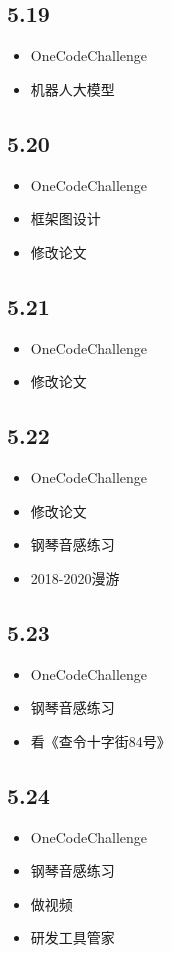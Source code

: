 \documentclass[UTF8]{ctexart}
\begin{document}
\subsection*{5.19}
\begin{itemize}
    \item OneCodeChallenge
    \item 机器人大模型
\end{itemize}

\subsection*{5.20}
\begin{itemize}
    \item OneCodeChallenge
    \item 框架图设计
    \item 修改论文
\end{itemize}

\subsection*{5.21}
\begin{itemize}
    \item OneCodeChallenge
    \item 修改论文
\end{itemize}

\subsection*{5.22}
\begin{itemize}
    \item OneCodeChallenge
    \item 修改论文
    \item 钢琴音感练习
    \item 2018-2020漫游
\end{itemize}

\subsection*{5.23}
\begin{itemize}
    \item OneCodeChallenge
    \item 钢琴音感练习
    \item 看《查令十字街84号》
\end{itemize}

\subsection*{5.24}
\begin{itemize}
    \item OneCodeChallenge
    \item 钢琴音感练习
    \item 做视频
    \item 研发工具管家
\end{itemize}
\end{document}

